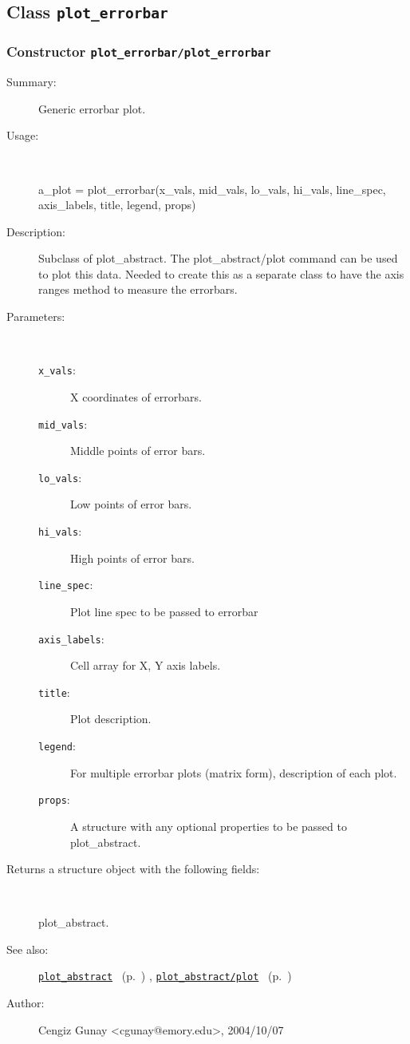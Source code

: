 \subsection{Class \texttt{plot\_errorbar}}%
%
\label{ref_plot_errorbar}%
\hypertarget{ref_plot_errorbar}{}%
\subsubsection[Constructor \texttt{plot\_errorbar}]{Constructor \texttt{plot\_errorbar/plot\_errorbar}}%
%
\label{ref_plot_errorbar__plot_errorbar}%
\hypertarget{ref_plot_errorbar__plot_errorbar}{}%
\begin{description}
\item[Summary:]Generic errorbar plot.
%
\item[Usage:]~%
\begin{lyxcode}%
a\_plot = plot\_errorbar(x\_vals, mid\_vals, lo\_vals, hi\_vals, line\_spec, 
			 axis\_labels, title, legend, props)
%
\end{lyxcode}%
%
\item[Description:]%
Subclass of plot\_abstract. The plot\_abstract/plot command can be used to
 plot this data. Needed to create this as a separate class to have the
 axis ranges method to measure the errorbars.
\item[Parameters:]~
\begin{description}%
\item[\texttt{x\_vals}:]
 X coordinates of errorbars.
\item[\texttt{mid\_vals}:]
 Middle points of error bars.
\item[\texttt{lo\_vals}:]
 Low points of error bars.
\item[\texttt{hi\_vals}:]
 High points of error bars.
\item[\texttt{line\_spec}:]
 Plot line spec to be passed to errorbar
\item[\texttt{axis\_labels}:]
 Cell array for X, Y axis labels.
\item[\texttt{title}:]
 Plot description.
\item[\texttt{legend}:]
 For multiple errorbar plots (matrix form), description of each plot.
\item[\texttt{props}:]
 A structure with any optional properties to be passed to plot\_abstract.
\end{description}%
%
\item[Returns a structure object with the following fields:
]~

	plot\_abstract.
%
%
\item[See also:]%
\hyperlink{ref_plot_abstract}{\texttt{plot\_abstract}}%
\ (p.~\pageref{ref_plot_abstract})%
%
, \hyperlink{ref_plot_abstract__plot}{\texttt{plot\_abstract/plot}}%
\ (p.~\pageref{ref_plot_abstract__plot})%
%
%
\item[Author:]%
Cengiz Gunay <cgunay@emory.edu>, 2004/10/07
%
\end{description}
\methodline%
